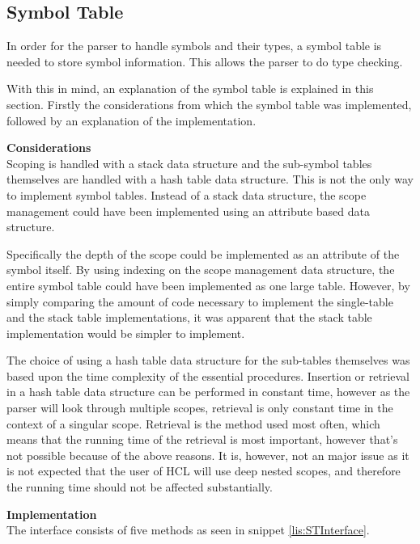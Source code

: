 \subsection{Symbol Table}
\label{sec:symbolTable}
In order for the parser to handle symbols and their types, a symbol table is needed to store symbol information.
This allows the parser to do type checking.

With this in mind, an explanation of the symbol table is explained in this section. 
Firstly the considerations from which the symbol table was implemented, followed by an explanation of the implementation.

\textbf{Considerations}\\
Scoping is handled with a stack data structure and the sub-symbol tables themselves are handled with a hash table data structure.
This is not the only way to implement symbol tables.
Instead of a stack data structure, the scope management could have been implemented using an attribute based data structure.

Specifically the depth of the scope could be implemented as an attribute of the symbol itself.
By using indexing on the scope management data structure, the entire symbol table could have been implemented as one large table.
However, by simply comparing the amount of code necessary to implement the single-table and the stack table implementations, it was apparent that the stack table implementation would be simpler to implement.

The choice of using a hash table data structure for the sub-tables themselves was based upon the time complexity of the essential procedures.
Insertion or retrieval in a hash table data structure can be performed in constant time, however as the parser will look through multiple scopes, retrieval is only constant time in the context of a singular scope.
Retrieval is the method used most often, which means that the running time of the retrieval is most important, however that's not possible because of the above reasons. 
It is, however, not an major issue as it is not expected that the user of HCL will use deep nested scopes, and therefore the running time should not be affected substantially.

\textbf{Implementation}\\
The interface consists of five methods as seen in snippet \ref{lis:STInterface}.

